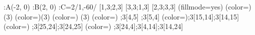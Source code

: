 \figinit{0.6cm}
\def\xB{2} %
\def\R{3} %
:A(-\xB, 0) :B(\xB, 0) :C=2/1,-60/
[1,\R;2,\R] [3,\R;1,\R]
[2,\R;3,\R]
\figdrawbegin{}
\figset(fillmode=yes)
\figset(color=\Redrgb) (\R)
\figset(color=\Greenrgb)(\R)
\figset(color=\Bluergb) (\R)
\figset(color=\Yellowrgb) ;\R[4,5] ;\R[5,4]
\figset(color=\Magentargb);\R[15,14];\R[14,15]
\figset(color=\Cyanrgb) ;\R[25,24];\R[24,25]
\figset(color=\Whitergb)
;\R[24,4];\R[4,14];\R[14,24]
\figdrawline[4,14,24]
\figdrawend
\centerline{\box\figBoxA}
